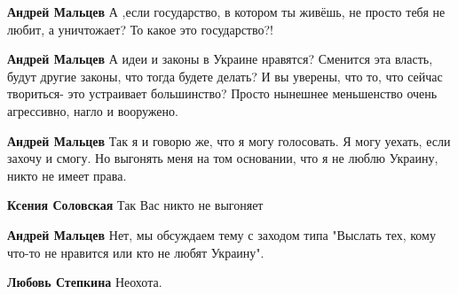 \begin{itemize}
\begin{itemize}
\textbf{Андрей Мальцев} А ,если государство, в котором ты живёшь, не просто тебя не любит, а уничтожает? То какое это государство?!

 
\textbf{Андрей Мальцев} А идеи и законы в Украине нравятся? Сменится эта
власть, будут другие законы, что тогда будете делать? И вы уверены, что то, что
сейчас твориться- это устраивает большинство? Просто нынешнее меньшенство очень
агрессивно, нагло и вооружено.

 
\textbf{Андрей Мальцев} Так я и говорю же, что я могу голосовать. Я могу
уехать, если захочу и смогу. Но выгонять меня на том основании, что я не люблю
Украину, никто не имеет права.

 
\textbf{Ксения Соловская} Так Вас никто не выгоняет

 
\textbf{Андрей Мальцев} Нет, мы обсуждаем тему с заходом типа "Выслать тех, кому что-то не нравится или кто не любят Украину".

 
\textbf{Любовь Степкина} Неохота.

 


\end{itemize}
\end{itemize}
